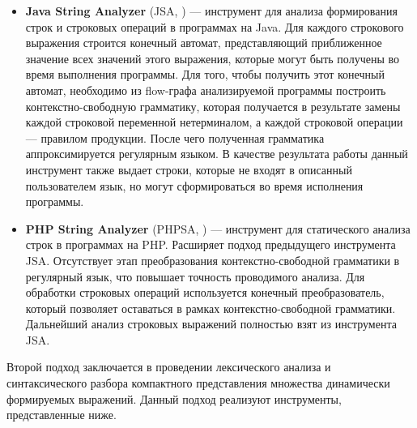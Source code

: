 \begin{itemize}
\item \textbf{Java String Analyzer} (JSA, \cite{JSA1, JSAUrl}) {---}  инструмент для анализа формирования строк и строковых операций в программах на Java. Для каждого строкового выражения строится конечный автомат, представляющий приближенное значение всех значений этого выражения, которые могут быть получены во время выполнения программы. Для того, чтобы получить этот конечный автомат, необходимо из flow-графа анализируемой программы построить контекстно-свободную грамматику, которая получается в результате замены каждой строковой переменной нетерминалом, а каждой строковой операции {---} правилом продукции. После чего полученная грамматика аппроксимируется регулярным языком. В качестве результата работы данный инструмент также выдает строки, которые не входят в описанный пользователем язык, но могут сформироваться во время исполнения программы. 

\item \textbf{PHP String Analyzer} (PHPSA, \cite{PHPSA, PHPSAUrl}) {---} инструмент для статического анализа строк в программах на PHP. Расширяет подход предыдущего инструмента JSA. Отсутствует этап преобразования контекстно-свободной грамматики в регулярный язык, что повышает точность проводимого анализа. Для обработки строковых операций используется конечный преобразователь, который позволяет оставаться в рамках контекстно-свободной грамматики. Дальнейший анализ строковых выражений полностью взят из инструмента JSA.
\end{itemize} 

Второй подход заключается в проведении лексического анализа и синтаксического разбора компактного представления множества динамически формируемых выражений. Данный подход реализуют инструменты, представленные ниже.

